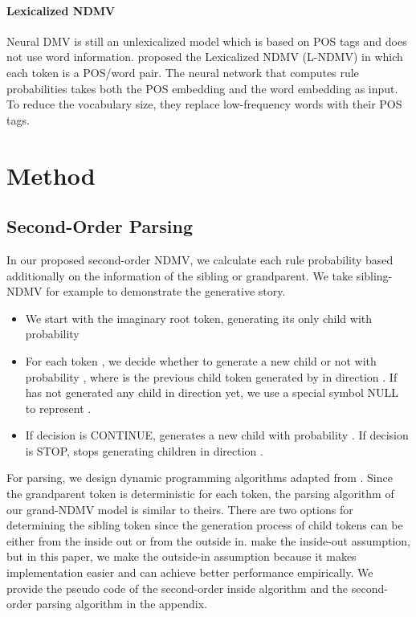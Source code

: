 \documentclass[11pt]{article}
\begin{document}
\paragraph{Lexicalized NDMV}
Neural DMV is still an unlexicalized model which is based on POS tags and does not use word information.  proposed the Lexicalized NDMV (L-NDMV) in which each token is a POS/word pair. The neural network that computes rule probabilities takes both the POS embedding and the word embedding as input. To reduce the vocabulary size, they replace low-frequency words with their POS tags. 

\section{Method}
\subsection{Second-Order Parsing}
In our proposed second-order NDMV, we calculate each rule probability based additionally on the information of the sibling or grandparent. We take sibling-NDMV for example to demonstrate the generative story.
\begin{itemize}
\setlength{\itemsep}{0pt}
\setlength{\parsep}{0pt}
\setlength{\parskip}{0pt}
    \item We start with the imaginary root token, generating its only child  with probability  
    \item For each token , we decide whether to generate a new child or not with probability , where  is the previous child token generated by  in direction .  If  has not generated any child in direction  yet, we use a special symbol
   NULL to represent . 
   \item If decision  is CONTINUE,  generates a new child  with probability . If decision  is STOP,  stops generating children in direction .
\end{itemize}

For parsing, we design dynamic programming algorithms adapted from . Since the grandparent token is deterministic for each token, the parsing algorithm of our grand-NDMV model is similar to theirs. There are two options for determining the sibling token since the generation process of child tokens can be either from the inside out or from the outside in.  make the inside-out assumption, but in this paper, we make the outside-in assumption because it makes implementation easier and can achieve better performance empirically. We provide the pseudo code of the second-order inside algorithm and the second-order parsing algorithm in the appendix.
\end{document}
